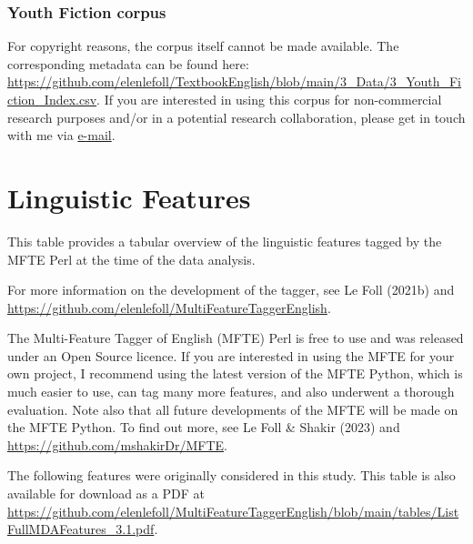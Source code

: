 \documentclass[
  letterpaper,
  DIV=11,
  numbers=noendperiod]{scrreprt}
\begin{document}
\subsection{Youth Fiction corpus}\label{youth-fiction-corpus}

For copyright reasons, the corpus itself cannot be made available. The
corresponding metadata can be found here:
\url{https://github.com/elenlefoll/TextbookEnglish/blob/main/3_Data/3_Youth_Fiction_Index.csv}.
If you are interested in using this corpus for non-commercial research
purposes and/or in a potential research collaboration, please get in
touch with me via \href{https://orcid.org/0000-0002-5839-8010}{e-mail}.

\chapter{Linguistic Features}\label{linguistic-features}

This table provides a tabular overview of the linguistic features tagged
by the MFTE Perl at the time of the data analysis.

For more information on the development of the tagger, see Le Foll
(2021b) and
\url{https://github.com/elenlefoll/MultiFeatureTaggerEnglish}.

\begin{tcolorbox}[enhanced jigsaw, titlerule=0mm, coltitle=black, breakable, title=\textcolor{quarto-callout-tip-color}{\faLightbulb}\hspace{0.5em}{Using the MFTE}, left=2mm, arc=.35mm, toprule=.15mm, leftrule=.75mm, rightrule=.15mm, colframe=quarto-callout-tip-color-frame, colbacktitle=quarto-callout-tip-color!10!white, bottomtitle=1mm, toptitle=1mm, bottomrule=.15mm, colback=white, opacityback=0, opacitybacktitle=0.6]

The Multi-Feature Tagger of English (MFTE) Perl is free to use and was
released under an Open Source licence. If you are interested in using
the MFTE for your own project, I recommend using the latest version of
the MFTE Python, which is much easier to use, can tag many more
features, and also underwent a thorough evaluation. Note also that all
future developments of the MFTE will be made on the MFTE Python. To find
out more, see Le Foll \& Shakir (2023) and
\url{https://github.com/mshakirDr/MFTE}.

\end{tcolorbox}

The following features were originally considered in this study. This
table is also available for download as a PDF at
\url{https://github.com/elenlefoll/MultiFeatureTaggerEnglish/blob/main/tables/ListFullMDAFeatures_3.1.pdf}.
\end{document}

